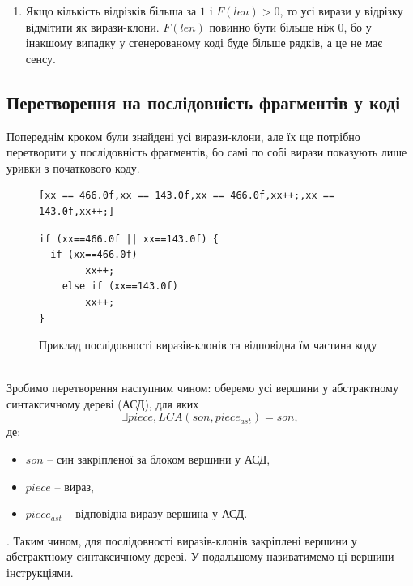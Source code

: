 \documentclass[a4paper, 14pt]{article}
\begin{document}
\begin{itemize}
{\begin{enumerate}
{де:
\begin{itemize}
\item $len*goodGraphs$ -- приблизна початкова кількість рядків коду;
\item $goodGraphs$ -- кількість потрібних викликів нової функції, кожен виклик зазвичай займає 1 рядок;
\item $2*T*goodGraphs$ -- приблизна кількість рядків коду, потрібного для врахування усіх відмінностей між послідовностями виразів;
\item $len$ -- приблизна кількість рядків коду, що є повністю ідентичним між усіма послідовностями;
\item $2$ -- кількість рядків, необхідна щоб записати функцію у коді.
\end{itemize}
$$F(len) = len*goodGraphs-goodGraphs-2*T*goodGraphs-len-2$$
$$F(len) = (len-1)*goodGraphs-2*T*goodGraphs-len-2$$
$$F(len) = (len-2*T-1)*goodGraphs-len-2$$
}
\item Якщо кількість відрізків більша за $1$ і $F(len)>0$, то усі вирази у відрізку відмітити як вирази-клони.
$F(len)$ повинно бути більше ніж 0, бо у інакшому випадку у сгенерованому коді буде більше рядків, а це не має сенсу.
\end{enumerate}
}
\end{itemize}
\subsection{Перетворення на послідовність фрагментів у коді}
Попереднім кроком були знайдені усі вирази-клони, але їх ще потрібно перетворити у послідовність фрагментів, бо самі по собі вирази показують лише уривки з початкового коду.   
\begin{figure}[h!]
\centering
\begin{minipage}{.5\textwidth}
\begin{lstlisting}[frame=none]
[xx == 466.0f,xx == 143.0f,xx == 466.0f,xx++;,xx == 143.0f,xx++;]
\end{lstlisting}
\end{minipage}
\begin{minipage}{.4\textwidth}
\begin{lstlisting}[frame=none]
if (xx==466.0f || xx==143.0f) {
  if (xx==466.0f)
		xx++;
	else if (xx==143.0f)
		xx++;
}	
\end{lstlisting}
\end{minipage}
\caption*{Приклад послідовності виразів-клонів та відповідна їм частина коду}
\end{figure} \\
Зробимо перетворення наступним чином: оберемо усі вершини у абстрактному синтаксичному дереві (АСД), для яких
$$\exists piece, LCA(son, piece_{ast}) = son,$$
де:
\begin{itemize}
\item $son$ -- син закріпленої за блоком вершини у АСД, 
\item $piece$ -- вираз, 
\item $piece_{ast}$ -- відповідна виразу вершина у АСД.
\end{itemize}.
Таким чином, для послідовності виразів-клонів закріплені вершини у абстрактному синтаксичному дереві.
У подальшому називатимемо ці вершини інструкціями.
\end{document}
